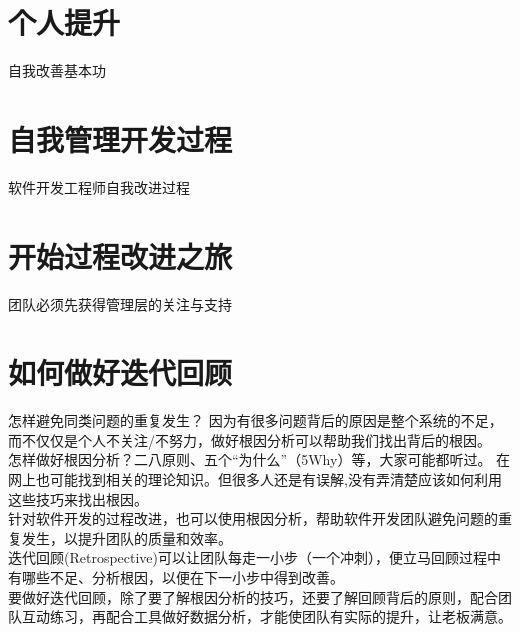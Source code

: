 \documentclass{book}        %
\begin{document}


\part{个人提升}自我改善基本功 \\




\part{自我管理开发过程}软件开发工程师自我改进过程\\









\part{开始过程改进之旅}团队必须先获得管理层的关注与支持\\





\part{如何做好迭代回顾}怎样避免同类问题的重复发生？ 因为有很多问题背后的原因是整个系统的不足， 而不仅仅是个人不关注/不努力，做好根因分析可以帮助我们找出背后的根因。\\

怎样做好根因分析？二八原则、五个“为什么”（5Why）等，大家可能都听过。 在网上也可能找到相关的理论知识。但很多人还是有误解,没有弄清楚应该如何利用这些技巧来找出根因。\\

针对软件开发的过程改进，也可以使用根因分析，帮助软件开发团队避免问题的重复发生，以提升团队的质量和效率。\\

迭代回顾(Retrospective)可以让团队每走一小步（一个冲刺），便立马回顾过程中有哪些不足、分析根因，以便在下一小步中得到改善。\\

要做好迭代回顾，除了要了解根因分析的技巧，还要了解回顾背后的原则，配合团队互动练习，再配合工具做好数据分析，才能使团队有实际的提升，让老板满意。\\
\end{document}
